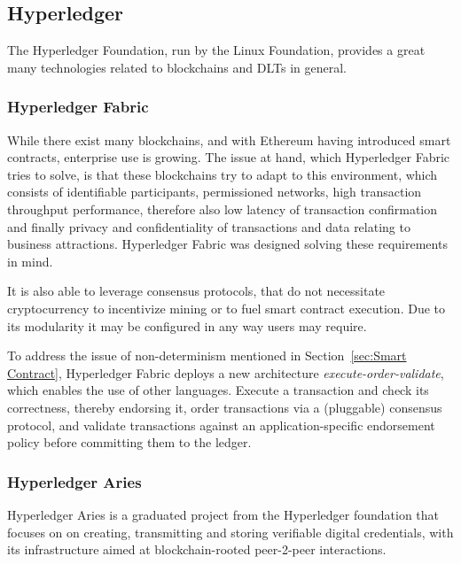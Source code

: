 \subsection{Hyperledger} %
\label{sub:Hyperledger}

The Hyperledger Foundation, run by the Linux Foundation, provides a great many technologies related to blockchains and
DLTs in general.

\subsubsection{Hyperledger Fabric} %
\label{sec:Hyperledger Fabric}
While there exist many blockchains, and with Ethereum having introduced smart contracts, enterprise use is growing. The
issue at hand, which Hyperledger Fabric tries to solve, is that these blockchains try to adapt to this environment,
which consists of identifiable participants, permissioned networks, high transaction throughput performance, therefore
also low latency of transaction confirmation and finally privacy and confidentiality of transactions and data relating
to business attractions. Hyperledger Fabric was designed solving these requirements in mind. \cite{hyperledger:fabric:docs}

It is also able to leverage consensus protocols, that do not necessitate cryptocurrency to incentivize mining or to
fuel smart contract execution. Due to its modularity it may be configured in any way users may require.

To address the issue of non-determinism mentioned in Section~\ref{sec:Smart Contract}, Hyperledger Fabric deploys a new
architecture \textit{execute-order-validate}, which enables the use of other languages. Execute a transaction and check
its correctness, thereby endorsing it, order transactions via a (pluggable) consensus protocol, and validate
transactions against an application-specific endorsement policy before committing them to the ledger. \cite{hyperledger:fabric:docs}

\subsubsection{Hyperledger Aries} %
\label{sec:Hyperledger Aries}
Hyperledger Aries is a graduated project from the Hyperledger foundation that focuses on on creating, transmitting and
storing verifiable digital credentials, with its infrastructure aimed at blockchain-rooted peer-2-peer interactions.

